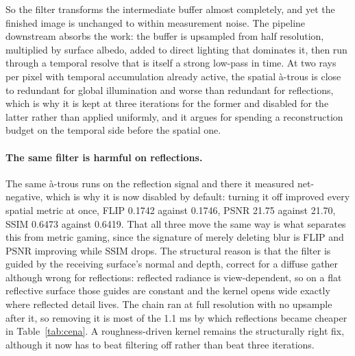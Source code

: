 So the filter transforms the intermediate buffer almost completely, and yet the finished image is
unchanged to within measurement noise. The pipeline downstream absorbs the work: the buffer is
upsampled from half resolution, multiplied by surface albedo, added to direct lighting that dominates
it, then run through a temporal resolve that is itself a strong low-pass in time. At two rays per pixel with
temporal accumulation already active, the spatial à-trous is close to redundant for global
illumination and worse than redundant for reflections, which is why it is kept at three iterations
for the former and disabled for the latter rather than applied uniformly, and it argues for spending
a reconstruction budget on the temporal side before the spatial one.

\paragraph{The same filter is harmful on reflections.} The same à-trous runs on the reflection signal
and there it measured net-negative, which is why it is now disabled by default: turning it off
improved every spatial metric at once, FLIP 0.1742 against 0.1746, PSNR 21.75 against 21.70, SSIM
0.6473 against 0.6419. That all three move the same way is what separates this from metric gaming,
since the signature of merely deleting blur is FLIP and PSNR improving while SSIM drops. The
structural reason is that the filter is guided by the receiving surface's normal and depth, correct
for a diffuse gather although wrong for reflections: reflected radiance is view-dependent, so on a
flat reflective surface those guides are constant and the kernel opens wide exactly where reflected
detail lives. The chain ran at full resolution with no upsample after it, so removing it is most of
the 1.1 ms by which reflections became cheaper in
Table~\ref{tab:cena}. A roughness-driven kernel remains the structurally right fix, although it now
has to beat filtering off rather than beat three iterations.

